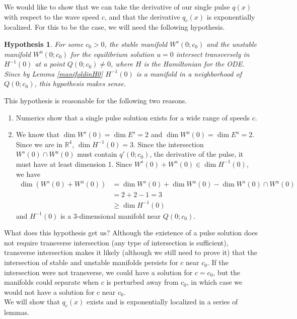 \documentclass[12pt]{article}
\def\R{{\mathbb R}}
\newtheorem{hypothesis}{Hypothesis}
\begin{document}
We would like to show that we can take the derivative of our single pulse $q(x)$ with respect to the wave speed $c$, and that the derivative $q_c(x)$ is exponentially localized. For this to be the case, we will need the following hypothesis.

\begin{hypothesis}\label{transverseint}
For some $c_0 > 0$, the stable manifold $W^s(0; c_0)$ and the unstable manifold $W^u(0; c_0)$ for the equilibrium solution $u = 0$ intersect transversely in $H^{-1}(0)$ at a point $Q(0; c_0) \neq 0$, where $H$ is the Hamiltonian for the ODE. Since by Lemma \eqref{manifoldinH0} $H^{-1}(0)$ is a manifold in a neighborhood of $Q(0; c_0)$, this hypothesis makes sense.
\end{hypothesis}

This hypothesis is reasonable for the following two reasons.
\begin{enumerate}
	\item Numerics show that a single pulse solution exists for a wide range of speeds $c$.
	\item We know that $\dim W^s(0) = \dim E^s = 2$ and $\dim W^u(0) = \dim E^u = 2$. Since we are in $\R^4$, $\dim H^{-1}(0) = 3$. Since the intersection $W^s(0) \cap W^u(0)$ must contain $q'(0; c_0)$, the derivative of the pulse, it must have at least dimension 1. Since $W^s(0) + W^u(0) \in \dim H^{-1}(0)$, we have
	\begin{align*}
	\dim( W^s(0) + W^u(0) ) &= \dim W^s(0) + \dim W^u(0) - \dim W^s(0) \cap W^u(0) \\
	&= 2 + 2 - 1 = 3 \\
	&\geq \dim H^{-1}(0)
	\end{align*}
	and $H^{-1}(0)$ is a 3-dimensional manifold near $Q(0; c_0)$.
\end{enumerate}

What does this hypothesis get us? Although the existence of a pulse solution does not require transverse intersection (any type of intersection is sufficient), transverse intersection makes it likely (although we still need to prove it) that the intersection of stable and unstable manifolds persists for $c$ near $c_0$. If the intersection were not transverse, we could have a solution for $c = c_0$, but the manifolds could separate when $c$ is perturbed away from $c_0$, in which case we would not have a solution for $c$ near $c_0$.\\

We will show that $q_c(x)$ exists and is exponentially localized in a series of lemmas.\\
\end{document}

